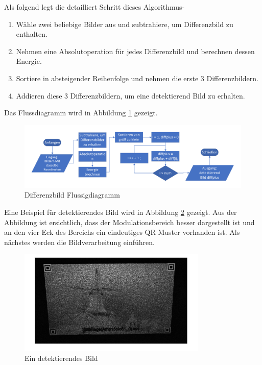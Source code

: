 Als folgend legt die detailliert Schritt dieses Algorithmus-

\begin{enumerate}
	\item Wähle zwei beliebige Bilder aus und subtrahiere, um Differenzbild zu enthalten.
	\item Nehmen eine Absolutoperation für jedes Differenzbild und berechnen dessen Energie. 
	\item Sortiere in absteigender Reihenfolge und nehmen die erste 3 Differenzbildern.
	\item Addieren diese 3 Differenzbildern, um eine detektierend Bild zu erhalten.
\end{enumerate}

Das Flussdiagramm wird in Abbildung \ref{fig:DifferenzbildFlussigdiagramm} gezeigt.
\begin{figure}[H]
 \centering 
 \includegraphics[keepaspectratio,width=1.1\textwidth]{images/4_ZweiteErfahrung/Differenzbild/Differenzbildflussigdiagramm.pdf}
 \caption{Differenzbild Flussigdiagramm}
 \label{fig:DifferenzbildFlussigdiagramm}
\end{figure} 

Eine Beispiel für detektierendes Bild wird in Abbildung \ref{fig:EindetektierendesBild} gezeigt. Aus der Abbildung ist ersichtlich, dass der Modulationsbereich besser dargestellt ist und an den vier Eck des Bereichs ein eindeutiges QR Muster vorhanden ist. Als nächstes werden die Bildverarbeitung einführen.

\begin{figure}[H]
 \centering 
 \includegraphics[keepaspectratio,width=0.8\textwidth]{images/4_ZweiteErfahrung/Differenzbild/diffplus.pdf}
 \caption{Ein detektierendes Bild}
 \label{fig:EindetektierendesBild}
\end{figure} 


